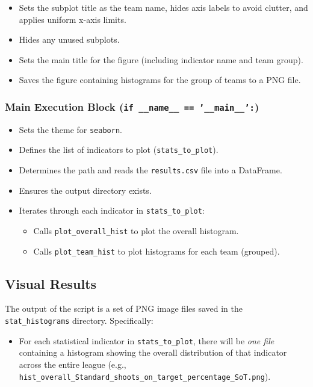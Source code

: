 \documentclass[12pt, a4paper]{report}
\begin{document}
\begin{itemize}
\begin{itemize}
\begin{itemize}
            \item Sets the subplot title as the team name, hides axis labels to avoid clutter, and applies uniform x-axis limits.
            \item Hides any unused subplots.
            \item Sets the main title for the figure (including indicator name and team group).
            \item Saves the figure containing histograms for the group of teams to a PNG file.
        \end{itemize}
    \end{itemize}
\end{itemize}

\subsubsection*{Main Execution Block (\texttt{if \_\_name\_\_ == '\_\_main\_\_':})}
\begin{itemize}
    \item Sets the theme for \texttt{seaborn}.
    \item Defines the list of indicators to plot (\texttt{stats\_to\_plot}).
    \item Determines the path and reads the \texttt{results.csv} file into a DataFrame.
    \item Ensures the output directory exists.
    \item Iterates through each indicator in \texttt{stats\_to\_plot}:
    \begin{itemize}
        \item Calls \texttt{plot\_overall\_hist} to plot the overall histogram.
        \item Calls \texttt{plot\_team\_hist} to plot histograms for each team (grouped).
    \end{itemize}
\end{itemize}

\subsection{Visual Results}
The output of the script is a set of PNG image files saved in the \texttt{stat\_histograms} directory.
Specifically:
\begin{itemize}
    \item For each statistical indicator in \texttt{stats\_to\_plot}, there will be \textit{one file} containing a histogram showing the overall distribution of that indicator across the entire league \sloppypar
    (e.g., \texttt{hist\_overall\_Standard\_shoots\_on\_target\_percentage\_SoT.png}).
\end{itemize}
\end{document}
